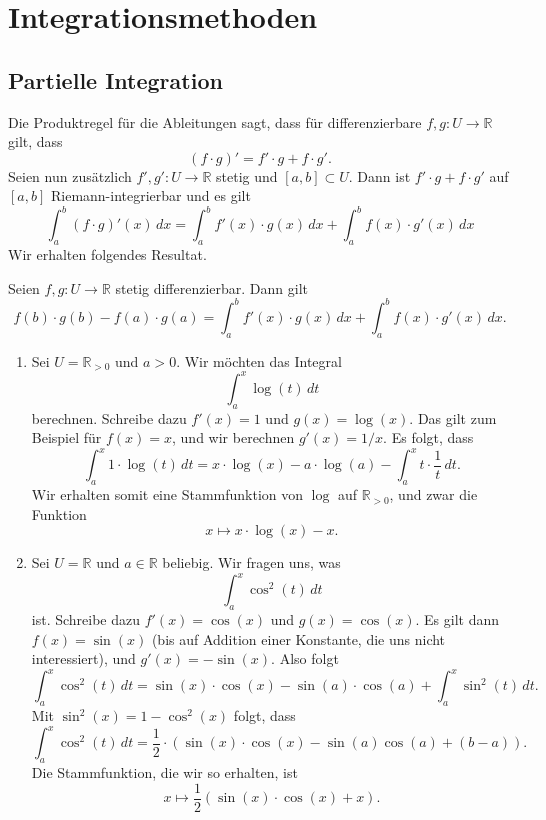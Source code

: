 \documentclass[../main.tex]{subfiles}
\begin{document}
\section{Integrationsmethoden}
\subsection*{Partielle Integration}
Die Produktregel für die Ableitungen sagt, dass für
differenzierbare $f, g \colon U \to \mathbb{R}$ gilt, dass
\[
  (f\cdot g)' = f'\cdot g + f\cdot g'.
\]
Seien nun zusätzlich $f', g' \colon U \to \mathbb{R}$ stetig
und $[a, b] \subset U$. Dann ist $f' \cdot g + f \cdot g'$ 
auf $[a, b]$ Riemann-integrierbar und es gilt
\[
  \int_{a}^{b} (f \cdot g)' (x) \, dx
  = \int_{a}^{b} f'(x) \cdot g(x) \, dx
  + \int_{a}^{b} f(x) \cdot g'(x) \, dx
\]
Wir erhalten folgendes Resultat.

\begin{byparts}
  Seien $f, g \colon U \to \mathbb{R}$ stetig differenzierbar.
  Dann gilt 
  \[
    f(b) \cdot g(b) - f(a) \cdot g(a)
    = \int_{a}^{b} f'(x) \cdot g(x) \, dx
    + \int_{a}^{b} f(x) \cdot g'(x) \, dx.
  \]
\end{byparts}

\begin{examples}
  \leavevmode
  \begin{enumerate}[(1)]
    \item Sei $U = \mathbb{R}_{>0}$ und $a  > 0$.
      Wir möchten das Integral
      \[
        \int_{a}^{x} \log(t) \, dt
      \]
      berechnen. Schreibe dazu
      $f'(x) = 1$ und $g(x) = \log (x)$.
      Das gilt zum Beispiel für $f(x) = x$,
      und wir berechnen $g'(x) = 1/x$.
      Es folgt, dass
      \[
        \int_{a}^{x} 1 \cdot \log(t) \, dt
        = x \cdot \log (x) - a \cdot \log (a)
        - \int_{a}^{x} t \cdot \frac{1}{t} \, dt.
      \]
      Wir erhalten somit eine Stammfunktion von $\log$ 
      auf $\mathbb{R}_{>0}$, und zwar die Funktion
      \[
        x \mapsto x \cdot \log(x) - x.
      \]
    \item Sei $U = \mathbb{R}$ und $a \in \mathbb{R}$ beliebig.
      Wir fragen uns, was
      \[
        \int_{a}^{x} \cos^2(t) \, dt
      \]
      ist. Schreibe dazu $f'(x) = \cos (x)$ 
      und $g(x) = \cos(x)$.
      Es gilt dann
      $f(x) = \sin(x)$ (bis auf Addition einer Konstante,
      die uns nicht interessiert), und $g'(x) = -\sin(x)$.
      Also folgt
      \[
        \int_{a}^{x} \cos^2(t) \, dt
        = \sin(x) \cdot \cos (x) -
        \sin(a) \cdot \cos (a) +
        \int_{a}^{x} \sin^2(t) \, dt.
      \]
      Mit $\sin^2(x) = 1 - \cos^2(x)$ folgt, dass
      \[
        \int_{a}^{x} \cos^2(t) \, dt
        = \frac{1}{2} \cdot
        \left( \sin(x) \cdot \cos(x) -
        \sin(a) \cos (a) + (b-a) \right).
      \]
      Die Stammfunktion, die wir so erhalten, ist
      \[
        x \mapsto \frac{1}{2} (\sin (x) \cdot \cos(x) + x).
      \]
  \end{enumerate}
\end{examples}
\end{document}
